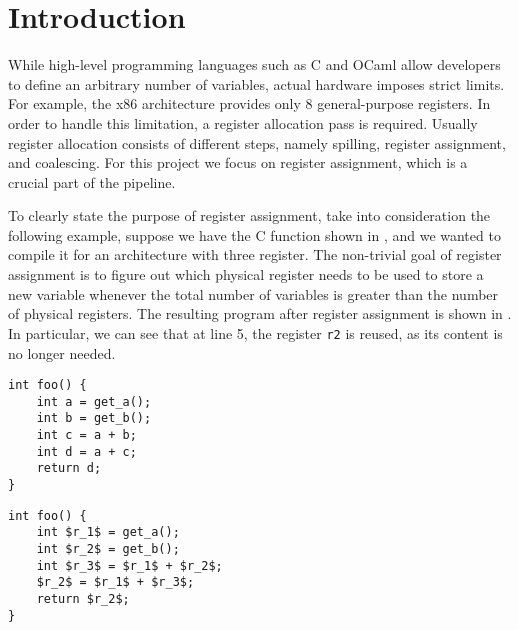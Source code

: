 
\chapter{Introduction}
\label{cha:intro}

While high-level programming languages such as C and OCaml allow developers to define an arbitrary number of variables, actual hardware imposes strict limits. For example, the x86 architecture provides only 8 general-purpose registers.
In order to handle this limitation, a register allocation pass is required. Usually register allocation consists of different steps, namely spilling, register assignment, and coalescing. For this project we focus on register assignment, which is a crucial part of the pipeline.

To clearly state the purpose of register assignment, take into consideration the following example, suppose we have the C function shown in , and we wanted to compile it for an architecture with three register. The non-trivial goal of register assignment is to figure out which physical register needs to be used to store a new variable whenever the total number of variables is greater than the number of physical registers. The resulting program after register assignment is shown in . In particular, we can see that at line 5, the register \texttt{r2} is reused, as its content is no longer needed.

\begin{minipage}{0.48\linewidth}
\centering
\lstset{style=C}
\begin{lstlisting}[caption={C program returning $2a+b$.}, label={fig:cbefore}]
int foo() {
    int a = get_a();
    int b = get_b();
    int c = a + b;
    int d = a + c;
    return d;
}
\end{lstlisting}
\end{minipage}
\hfill
\begin{minipage}{0.48\linewidth}
\centering
\lstset{style=C}
\begin{lstlisting}[caption={Same C program after register assignment.}, label={fig:cafter}]
int foo() {
    int $r_1$ = get_a();
    int $r_2$ = get_b();
    int $r_3$ = $r_1$ + $r_2$;
    $r_2$ = $r_1$ + $r_3$;
    return $r_2$;
}
\end{lstlisting}
\end{minipage}

